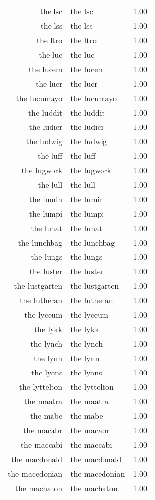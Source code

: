 \begin{table}[ht]
\begin{tabular}{rlr}
  the lsc & the lsc & 1.00 \\ 
  the lss & the lss & 1.00 \\ 
  the ltro & the ltro & 1.00 \\ 
  the luc & the luc & 1.00 \\ 
  the lucem & the lucem & 1.00 \\ 
  the lucr & the lucr & 1.00 \\ 
  the lucumayo & the lucumayo & 1.00 \\ 
  the luddit & the luddit & 1.00 \\ 
  the ludicr & the ludicr & 1.00 \\ 
  the ludwig & the ludwig & 1.00 \\ 
  the luff & the luff & 1.00 \\ 
  the lugwork & the lugwork & 1.00 \\ 
  the lull & the lull & 1.00 \\ 
  the lumin & the lumin & 1.00 \\ 
  the lumpi & the lumpi & 1.00 \\ 
  the lunat & the lunat & 1.00 \\ 
  the lunchbag & the lunchbag & 1.00 \\ 
  the lungs & the lungs & 1.00 \\ 
  the luster & the luster & 1.00 \\ 
  the lustgarten & the lustgarten & 1.00 \\ 
  the lutheran & the lutheran & 1.00 \\ 
  the lyceum & the lyceum & 1.00 \\ 
  the lykk & the lykk & 1.00 \\ 
  the lynch & the lynch & 1.00 \\ 
  the lynn & the lynn & 1.00 \\ 
  the lyons & the lyons & 1.00 \\ 
  the lyttelton & the lyttelton & 1.00 \\ 
  the maatra & the maatra & 1.00 \\ 
  the mabe & the mabe & 1.00 \\ 
  the macabr & the macabr & 1.00 \\ 
  the maccabi & the maccabi & 1.00 \\ 
  the macdonald & the macdonald & 1.00 \\ 
  the macedonian & the macedonian & 1.00 \\ 
  the machaton & the machaton & 1.00 \\ 

\end{tabular}
\end{table}
